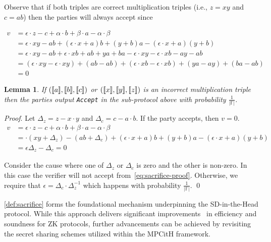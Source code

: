 \documentclass[11pt]{report}
\theoremstyle{definition}
\theoremstyle{plain}
\newtheorem{lemma}{Lemma}[section]
\begin{document}
Observe that if both triples are correct multiplication triples (i.e., $z = xy$ and $c = ab$) then the parties will always accept since

\begin{align*}
  v & = \epsilon \cdot z - c + \alpha \cdot b + \beta \cdot a - \alpha \cdot \beta                                            \\
    & = \epsilon \cdot xy - ab + (\epsilon \cdot x + a)b + (y + b)a - (\epsilon \cdot x + a)(y + b)                           \\
    & = \epsilon \cdot xy - ab + \epsilon \cdot xb + ab + ya + ba - \epsilon \cdot xy - \epsilon \cdot xb - ay - ab           \\
    & = (\epsilon \cdot xy - \epsilon \cdot xy) + (ab - ab) + (\epsilon \cdot xb - \epsilon \cdot xb) + (ya - ay) + (ba - ab) \\
    & = 0
\end{align*}

\begin{lemma}\label{lem:sacrifice_soundness}
  If $(\llbracket a \rrbracket, \llbracket b \rrbracket, \llbracket c \rrbracket)$ or $(\llbracket x \rrbracket, \llbracket y \rrbracket, \llbracket z \rrbracket)$ is an incorrect multiplication triple then the parties output \texttt{Accept} in the sub-protocol above with probability $\frac{1}{|\mathbb{F}|}$.
\end{lemma}

\textit{Proof}. Let $\Delta_z = z - x \cdot y$ and $\Delta_c = c - a \cdot b$. If the party accepts, then $v = 0$.
\begin{align}
  v & = \epsilon \cdot z - c + \alpha \cdot b + \beta \cdot a - \alpha \cdot \beta                           \nonumber          \\
    & = \cdot (xy + \Delta_z ) - (ab + \Delta_c) + (\epsilon \cdot x + a)b + (y + b)a - (\epsilon \cdot x + a)(y + b) \nonumber \\
    & = \epsilon\Delta_z - \Delta_c = 0 \label{eq:sacrifice-proof}
\end{align}

Consider the cause where one of $\Delta_z$ or $\Delta_c$ is zero and the other is non-zero. In this case the verifier will not accept from~\ref{eq:sacrifice-proof}. Otherwise, we require that $\epsilon = \Delta_c \cdot \Delta_z^{-1}$ which happens with probability $\frac{1}{|\mathbb{F}|}$. \qed

\autoref{def:sacrifice} forms the foundational mechanism underpinning the SD-in-the-Head protocol. While this approach delivers significant improvements~\cite{baum2020concretely,feneuil2022syndrome} in efficiency and soundness for ZK protocols, further advancements can be achieved by revisiting the secret sharing schemes utilized within the MPCitH framework.
\end{document}

